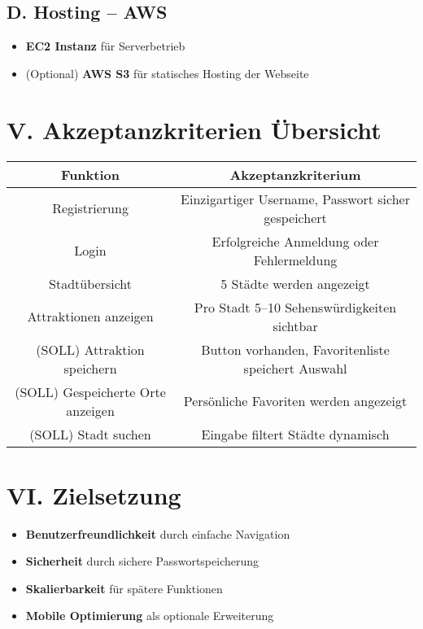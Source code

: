\documentclass[a4paper,12pt]{article}
\begin{document}
    \subsection*{D. Hosting – AWS}
    \begin{itemize}
        \item \textbf{EC2 Instanz} für Serverbetrieb
        \item (Optional) \textbf{AWS S3} für statisches Hosting der Webseite
    \end{itemize}

    \section*{V. Akzeptanzkriterien Übersicht}
    \begin{tabular}{|c|c|}
        \hline
        \textbf{Funktion} & \textbf{Akzeptanzkriterium} \\
        \hline
        Registrierung & Einzigartiger Username, Passwort sicher gespeichert \\
        Login & Erfolgreiche Anmeldung oder Fehlermeldung \\
        Stadtübersicht & 5 Städte werden angezeigt \\
        Attraktionen anzeigen & Pro Stadt 5–10 Sehenswürdigkeiten sichtbar \\
        (SOLL) Attraktion speichern & Button vorhanden, Favoritenliste speichert Auswahl \\
        (SOLL) Gespeicherte Orte anzeigen & Persönliche Favoriten werden angezeigt \\
        (SOLL) Stadt suchen & Eingabe filtert Städte dynamisch \\
        \hline
    \end{tabular}

    \section*{VI. Zielsetzung}
    \begin{itemize}
        \item \textbf{Benutzerfreundlichkeit} durch einfache Navigation
        \item \textbf{Sicherheit} durch sichere Passwortspeicherung
        \item \textbf{Skalierbarkeit} für spätere Funktionen
        \item \textbf{Mobile Optimierung} als optionale Erweiterung
    \end{itemize}
\end{document}
